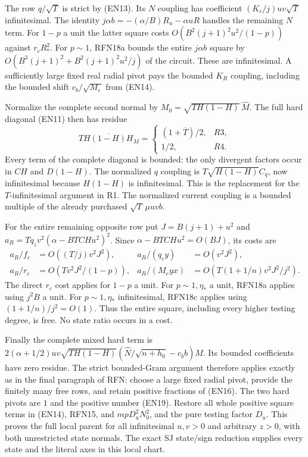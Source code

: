 The row $q/\sqrt T$ is strict by (EN13).
Its $N$ coupling has coefficient $(K_c/j)uv\sqrt T$ infinitesimal.
The identity $j\alpha b=-(\alpha/B)R_u-\alpha uR$ handles
the remaining $N$ term. For $1-p$ a unit the latter square costs
$O(B^2(j+1)^2u^2/(1-p))$ against $r_cR_*^2$.
For $p\sim1$, RFN18a bounds the entire $j\alpha b$ square by
$O(B^3(j+1)^2+B^2(j+1)^2u^2/j)$ of the circuit.
These are infinitesimal. A sufficiently large fixed real radial
pivot pays the bounded $K_R$ coupling, including the bounded shift
$c_b/\sqrt{M_e}$ from (EN14).

Normalize the complete second normal by
$M_0=\sqrt{TH(1-H)}\,\widehat M$. The full hard diagonal (EN11)
then has residue
\[
\overline{TH(1-H)H_M}=
\begin{cases}
(1+\overline T)/2,&R3,\\
1/2,&R4 .
\end{cases}                                                    \tag{EN19}
\]
Every term of the complete diagonal is bounded: the only divergent
factors occur in $CH$ and $D(1-H)$.
The normalized $q$ coupling is
$T\sqrt{H(1-H)}C_q$, now infinitesimal because
$H(1-H)$ is infinitesimal. This is the replacement for the
$T$-infinitesimal argument in R1.
The normalized current coupling is a bounded multiple of the
already purchased $\sqrt T\,\mu uvb$.

For the entire remaining opposite row put $J=B(j+1)+u^2$ and
$a_R=Tq_zv^2(\alpha-BTCHu^2)^2$.
Since $\alpha-BTCHu^2=O(BJ)$, its costs are
\[
\begin{aligned}
a_R/f_c&=O((T/j)v^2J^2),&
a_R/(q_cy)&=O(v^2J^2),\\
a_R/r_c&=O(Tv^2J^2/(1-p)),&
a_R/(M_eyx)&=O(T(1+1/n)v^2J^2/j^2).
\end{aligned}                                                    \tag{EN20}
\]
The direct $r_c$ cost applies for $1-p$ a unit.
For $p\sim1,\eta_*$ a unit, RFN18a applies using $j^2B$ a unit.
For $p\sim1,\eta_*$ infinitesimal, RFN18c applies using
$(1+1/n)/j^2=O(1)$. Thus the entire square, including every
higher testing degree, is free. No state ratio occurs in a cost.

Finally the complete mixed hard term is
$2(\alpha+1/2)uv\sqrt{TH(1-H)}
(\widehat N/\sqrt{n+h_0}-c_bb)\widehat M$.
Its bounded coefficients have zero residue.
The strict bounded-Gram argument therefore applies exactly as in
the final paragraph of RFN: choose a large fixed radial pivot, provide
the finitely many free rows, and retain positive fractions of
(EN16). The two hard pivots are $1$ and the positive number
(EN19). Restore all whole positive square terms in (EN14), RFN15, and
$mpD_u^2N_0^2$, and the pure testing factor $D_u$.
This proves the full local parent for all infinitesimal $u,v>0$
and arbitrary $z>0$, with both unrestricted state normals.
The exact SJ state/sign reduction supplies every state and the
literal axes in this local chart.

